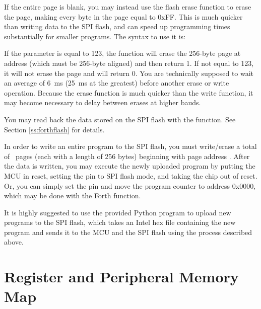 \documentclass[11pt,pdftex,portrait,letterpaper]{article}
\begin{document}
If the entire page is blank, you may instead use the flash erase  function to erase the page, making every byte in the page equal to 0xFF. This is much quicker than writing data to the SPI flash, and can speed up programming times substantially for smaller programs. The syntax to use it is:

\noindent{}

If the  parameter is equal to 123, the function will erase the 256-byte page at address  (which must be 256-byte aligned) and then return 1. If not equal to 123, it will not erase the page and will return 0. You are technically supposed to wait an average of 6~ms (25~ms at the greatest) before another erase or write operation. Because the erase function is much quicker than the write function, it may become necessary to delay between erases at higher bauds.

You may read back the data stored on the SPI flash with the  function. See Section \ref{ss:forthflash} for details.

In order to write an entire program to the SPI flash, you must write/erase a total of \RamNumPages\ pages (each with a length of 256 bytes) beginning with page address \RamStartAddress. After the data is written, you may execute the newly uploaded program by putting the MCU in reset, setting the  pin to SPI flash mode, and taking the chip out of reset. Or, you can simply set the  pin and move the program counter to address 0x0000, which may be done with the  Forth function.

It is highly suggested to use the provided Python program  to upload new programs to the SPI flash, which takes an Intel hex file containing the new program and sends it to the MCU and the SPI flash using the process described above.

\newpage







\section{Register and Peripheral Memory Map} \label{s:regMemMap}


\newpage
\end{document}
